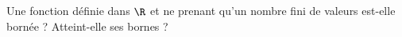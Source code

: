 Une fonction d\'efinie dans $\R$ et ne prenant qu'un nombre fini de valeurs est-elle born\'ee ? Atteint-elle ses bornes ?